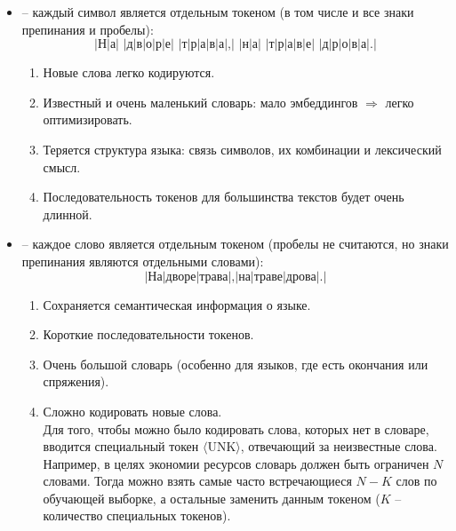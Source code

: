 \documentclass[12pt]{article}
\theoremstyle{definition} %
\theoremstyle{plain} %
\theoremstyle{remark} %
\begin{document}
\begin{itemize}
    \item {} -- каждый символ является отдельным токеном (в том числе и все знаки препинания и пробелы):
    \[
    \textit{|Н|а| |д|в|о|р|е| |т|р|а|в|а|,| |н|а| |т|р|а|в|е| |д|р|о|в|а|.|}
    \]
    \begin{enumerate}
        \item[\textbf{\textcolor{green}{($+$)}}]
        Новые слова легко кодируются.
        \item[\textbf{\textcolor{green}{($+$)}}]
        Известный и очень маленький словарь: мало эмбеддингов $\Rightarrow$ легко оптимизировать.
        \item[\textbf{\textcolor{red}{($-$)}}]
        Теряется структура языка: связь символов, их комбинации и лексический смысл.
        \item[\textbf{\textcolor{red}{($-$)}}]
        Последовательность токенов для большинства текстов будет очень длинной.
    \end{enumerate}
    \item {} -- каждое слово является отдельным токеном (пробелы не считаются, но знаки препинания являются отдельными словами):
    \[
    \textit{|На|дворе|трава|,|на|траве|дрова|.|}
    \]
    \begin{enumerate}
        \item[\textbf{\textcolor{green}{($+$)}}]
        Сохраняется семантическая информация о языке.
        \item[\textbf{\textcolor{green}{($+$)}}]
        Короткие последовательности токенов. 
        \item[\textbf{\textcolor{red}{($-$)}}]
        Очень большой словарь (особенно для языков, где есть окончания или спряжения).
        \item[\textbf{\textcolor{red}{($-$)}}]
        Сложно кодировать новые слова. \\
        
        Для того, чтобы можно было кодировать слова, которых нет в словаре, вводится специальный токен $\langle$UNK$\rangle$, отвечающий за неизвестные слова.\\
        
        Например, в целях экономии ресурсов словарь должен быть ограничен $N$ словами. Тогда можно взять самые часто встречающиеся $N - K$ слов по обучающей выборке, а остальные заменить данным токеном ($K$ -- количество специальных токенов).
    \end{enumerate}


\end{itemize}
\end{document}
